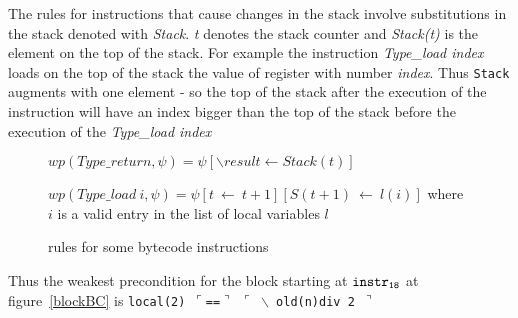 The rules for instructions that cause changes in the stack involve substitutions in the stack denoted with \textit{Stack}. \textit{t} denotes the stack counter and \textit{Stack(t)} is the element on the top of the stack. For example the instruction \textit{Type\_load index} loads on the top of the stack the value of register with number \textit{index}. Thus \texttt{Stack} augments with one element - so the top of the stack after the execution of the instruction will have an index bigger than the top of the stack before the  execution of the \textit{Type\_load index}

\begin{figure}[ht]
$
wp(Type\_return , \psi) = \psi[ \backslash result \leftarrow Stack(t)]
$

$
wp(Type\_load \ i, \psi) = \psi[t \ \leftarrow \ t+1] [S(t+1) \ \leftarrow \ l(i)]
$ where $i$ is a valid entry in the list of local variables $l$

\caption{rules for some bytecode instructions}
\label{instrWP}
\end{figure}

Thus the weakest precondition for the block starting at $\tt{instr_{18}}$ at figure~\ref{blockBC} is
\texttt{local(2) $\ulcorner$==$\urcorner$ $\ulcorner$ $\backslash$ old(n)div 2 $\urcorner$}

